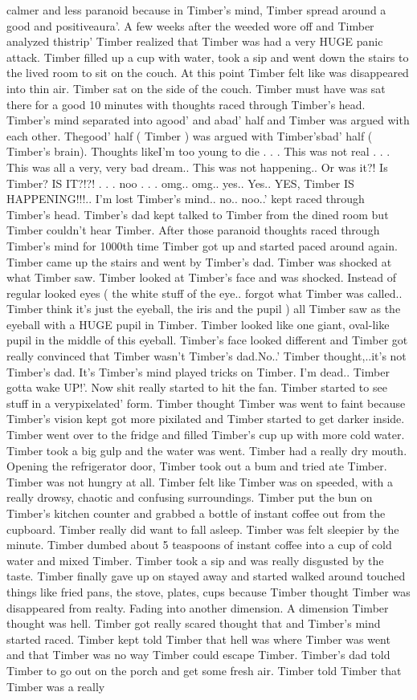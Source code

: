 \documentclass[12pt]{book}
\begin{document}
calmer and less paranoid because in Timber's mind, Timber spread around a good and positiveaura'. A few weeks after the weeded wore off and Timber analyzed thistrip' Timber realized that Timber was had a very HUGE panic attack. Timber filled up a cup with water, took a sip and went down the stairs to the lived room to sit on the couch. At this point Timber felt like was disappeared into thin air. Timber sat on the side of the couch. Timber must have was sat there for a good 10 minutes with thoughts raced through Timber's head. Timber's mind separated into agood' and abad' half and Timber was argued with each other. Thegood' half ( Timber ) was argued with Timber'sbad' half ( Timber's brain). Thoughts likeI'm too young to die . . .  This was not real . . .  This was all a very, very bad dream.. This was not happening.. Or was it?! Is Timber? IS IT?!?! . . .  noo . . .  omg.. omg.. yes.. Yes.. YES, Timber IS HAPPENING!!!.. I'm lost Timber's mind.. no.. noo..' kept raced through Timber's head. Timber's dad kept talked to Timber from the dined room but Timber couldn't hear Timber. After those paranoid thoughts raced through Timber's mind for 1000th time Timber got up and started paced around again. Timber came up the stairs and went by Timber's dad. Timber was shocked at what Timber saw. Timber looked at Timber's face and was shocked. Instead of regular looked eyes ( the white stuff of the eye.. forgot what Timber was called.. Timber think it's just the eyeball, the iris and the pupil ) all Timber saw as the eyeball with a HUGE pupil in Timber. Timber looked like one giant, oval-like pupil in the middle of this eyeball. Timber's face looked different and Timber got really convinced that Timber wasn't Timber's dad.No..' Timber thought,..it's not Timber's dad. It's Timber's mind played tricks on Timber. I'm dead.. Timber gotta wake UP!'. Now shit really started to hit the fan. Timber started to see stuff in a verypixelated' form. Timber thought Timber was went to faint because Timber's vision kept got more pixilated and Timber started to get darker inside. Timber went over to the fridge and filled Timber's cup up with more cold water. Timber took a big gulp and the water was went. Timber had a really dry mouth. Opening the refrigerator door, Timber took out a bum and tried ate Timber. Timber was not hungry at all. Timber felt like Timber was on speeded, with a really drowsy, chaotic and confusing surroundings. Timber put the bun on Timber's kitchen counter and grabbed a bottle of instant coffee out from the cupboard. Timber really did want to fall asleep. Timber was felt sleepier by the minute. Timber dumbed about 5 teaspoons of instant coffee into a cup of cold water and mixed Timber. Timber took a sip and was really disgusted by the taste. Timber finally gave up on stayed away and started walked around touched things like fried pans, the stove, plates, cups because Timber thought Timber was disappeared from realty. Fading into another dimension. A dimension Timber thought was hell. Timber got really scared thought that and Timber's mind started raced. Timber kept told Timber that hell was where Timber was went and that Timber was no way Timber could escape Timber. Timber's dad told Timber to go out on the porch and get some fresh air. Timber told Timber that Timber was a really 
\end{document}
